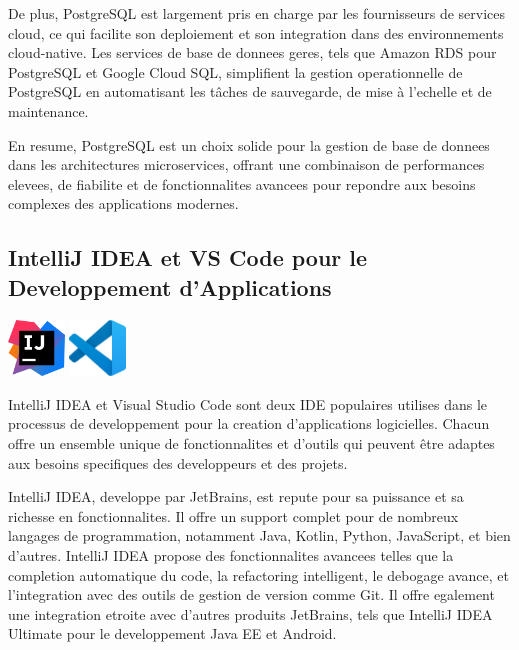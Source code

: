 \documentclass[a4paper, 11pt, openany]{report}
\begin{document}
De plus, PostgreSQL est largement pris en charge par les fournisseurs de services cloud, ce qui facilite son deploiement et son integration dans des environnements cloud-native. Les services de base de donnees geres, tels que Amazon RDS pour PostgreSQL et Google Cloud SQL, simplifient la gestion operationnelle de PostgreSQL en automatisant les tâches de sauvegarde, de mise à l'echelle et de maintenance.

En resume, PostgreSQL est un choix solide pour la gestion de base de donnees dans les architectures microservices, offrant une combinaison de performances elevees, de fiabilite et de fonctionnalites avancees pour repondre aux besoins complexes des applications modernes.



\subsection{IntelliJ IDEA et VS Code pour le Developpement d'Applications}
\begin{center}
\includegraphics[height=1.5cm]{assets/images/intellij.png}
\includegraphics[height=1.5cm]{assets/images/vscode.jpg}
\end{center}

IntelliJ IDEA et Visual Studio Code sont deux IDE populaires utilises dans le processus de developpement pour la creation d'applications logicielles. Chacun offre un ensemble unique de fonctionnalites et d'outils qui peuvent être adaptes aux besoins specifiques des developpeurs et des projets.

IntelliJ IDEA, developpe par JetBrains, est repute pour sa puissance et sa richesse en fonctionnalites. Il offre un support complet pour de nombreux langages de programmation, notamment Java, Kotlin, Python, JavaScript, et bien d'autres. IntelliJ IDEA propose des fonctionnalites avancees telles que la completion automatique du code, la refactoring intelligent, le debogage avance, et l'integration avec des outils de gestion de version comme Git. Il offre egalement une integration etroite avec d'autres produits JetBrains, tels que IntelliJ IDEA Ultimate pour le developpement Java EE et Android.
\end{document}
